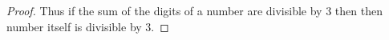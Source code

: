 \documentclass[12pt, fullpage]{article}
\begin{document}
\begin{proof}
\begin{comment}
( ((\beta_0)\bmod 3*1) \bmod 3 + ((\beta_1)\bmod 3 * 1) \bmod 3 +((\beta_2)\bmod 3 * 1)\bmod 3)+&\\ \bmod 3 + ... + ((\beta_i)\bmod 3 * 1) \bmod 3 )\bmod 3 &=\\
( ((\beta_0)\bmod 3*(10^0)\bmod3) \bmod 3 + ((\beta_1)\bmod 3 * (10^1)\bmod 3) \bmod 3 & +\\((\beta_2)\bmod 3 * (10^2))\bmod 3) \bmod 3 + ... + ((\beta_i)\bmod 3 * (10^i)\bmod 3) \bmod 3 )\bmod 3 &= \\
( (\beta_0*10^0) \bmod 3 + (\beta_1 * 10^1) \bmod 3 + (\beta_2 * 10^2) \bmod 3 + ... + (\beta_i * 10^i) \bmod 3 )\bmod 3 &=\\
( \beta_0*10^0 + \beta_1 * 10^1 + \beta_2 * 10^2 + ... + \beta_i * 10^i ) \bmod 3 &= 0\\
( \beta) \bmod 3 &= 0
\end{align*}
\end{comment}

Thus if the sum of the digits of a number are divisible by 3 then then number itself is divisible by 3.

\end{proof}
\end{document}
